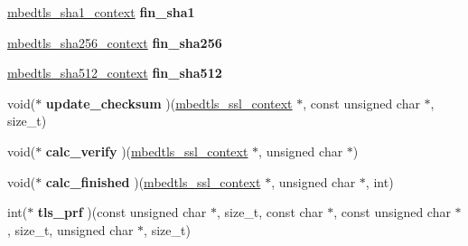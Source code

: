 \begin{DoxyCompactItemize}
\item 
\hypertarget{structmbedtls__ssl__handshake__params_ad0196daffb9450149c00a920c286db53}{\hyperlink{structmbedtls__sha1__context}{mbedtls\-\_\-sha1\-\_\-context} {\bfseries fin\-\_\-sha1}}\label{structmbedtls__ssl__handshake__params_ad0196daffb9450149c00a920c286db53}

\item 
\hypertarget{structmbedtls__ssl__handshake__params_a27db74c184eaf379d217fe26228a4dfb}{\hyperlink{structmbedtls__sha256__context}{mbedtls\-\_\-sha256\-\_\-context} {\bfseries fin\-\_\-sha256}}\label{structmbedtls__ssl__handshake__params_a27db74c184eaf379d217fe26228a4dfb}

\item 
\hypertarget{structmbedtls__ssl__handshake__params_aa3a4af54e6efae22bcdcc0c2c7cebb73}{\hyperlink{structmbedtls__sha512__context}{mbedtls\-\_\-sha512\-\_\-context} {\bfseries fin\-\_\-sha512}}\label{structmbedtls__ssl__handshake__params_aa3a4af54e6efae22bcdcc0c2c7cebb73}

\item 
\hypertarget{structmbedtls__ssl__handshake__params_aef6011f45ef4c05dc46bfd53d0769f9f}{void($\ast$ {\bfseries update\-\_\-checksum} )(\hyperlink{structmbedtls__ssl__context}{mbedtls\-\_\-ssl\-\_\-context} $\ast$, const unsigned char $\ast$, size\-\_\-t)}\label{structmbedtls__ssl__handshake__params_aef6011f45ef4c05dc46bfd53d0769f9f}

\item 
\hypertarget{structmbedtls__ssl__handshake__params_a0fb8cee60df5d3450be1745525cce5d9}{void($\ast$ {\bfseries calc\-\_\-verify} )(\hyperlink{structmbedtls__ssl__context}{mbedtls\-\_\-ssl\-\_\-context} $\ast$, unsigned char $\ast$)}\label{structmbedtls__ssl__handshake__params_a0fb8cee60df5d3450be1745525cce5d9}

\item 
\hypertarget{structmbedtls__ssl__handshake__params_a31ac56c0b8ff116dfd19854e1052f605}{void($\ast$ {\bfseries calc\-\_\-finished} )(\hyperlink{structmbedtls__ssl__context}{mbedtls\-\_\-ssl\-\_\-context} $\ast$, unsigned char $\ast$, int)}\label{structmbedtls__ssl__handshake__params_a31ac56c0b8ff116dfd19854e1052f605}

\item 
\hypertarget{structmbedtls__ssl__handshake__params_a5a412321bd0d5c7b7948f6de6cd76adc}{int($\ast$ {\bfseries tls\-\_\-prf} )(const unsigned char $\ast$, size\-\_\-t, const char $\ast$, const unsigned char $\ast$, size\-\_\-t, unsigned char $\ast$, size\-\_\-t)}\label{structmbedtls__ssl__handshake__params_a5a412321bd0d5c7b7948f6de6cd76adc}


\end{DoxyCompactItemize}
